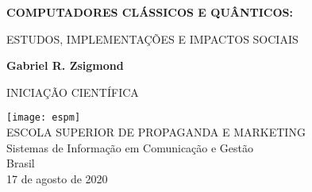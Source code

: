 \begin{titlepage}
    \begin{center}
        \vspace*{1cm}
        \LARGE
        \textbf{COMPUTADORES CLÁSSICOS E QUÂNTICOS:}
        
        \vspace{0.5cm}
        \large
        ESTUDOS, IMPLEMENTAÇÕES E IMPACTOS SOCIAIS
        
        \vspace{1.5cm}
        
        \textbf{Gabriel R. Zsigmond}
        \vfill
        
        INICIAÇÃO CIENTÍFICA
        
        \vspace{0.8cm}
        
        \texttt{[image: espm]}\\
        \large
        ESCOLA SUPERIOR DE PROPAGANDA E MARKETING\\
        Sistemas de Informação em Comunicação e Gestão\\
        Brasil\\
        17 de agosto de 2020\\
        
    \end{center}
\end{titlepage}
